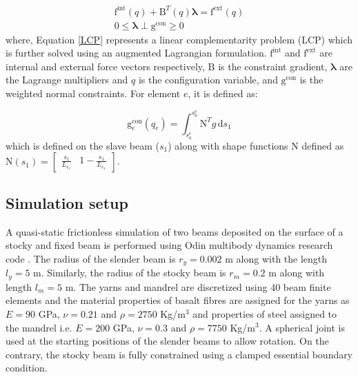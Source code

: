 \begin{subequations}
\begin{gather}
\boldsymbol{\mathrm{f}}^{\textrm{int}}(q) + \boldsymbol{\mathrm{B}}^{T}(q) \boldsymbol{\lambda} = \boldsymbol{\mathrm{f}}^{\textrm{ext}}(q)\\ %
\boldsymbol{\mathrm{0}} \leq \boldsymbol{\lambda} \perp \boldsymbol{\mathrm{g}}^{\textrm{con}} \geq \boldsymbol{\mathrm{0}} \label{LCP}
\end{gather}
\label{equilibrium}
\end{subequations}
where, Equation \ref{LCP} represents a linear complementarity problem (LCP) which is further solved using an augmented Lagrangian formulation. $\boldsymbol{\mathrm{f}}^{\textrm{int}}$ and $\boldsymbol{\mathrm{f}}^{\textrm{ext}}$ are internal and external force vectors respectively, $\boldsymbol{\mathrm{B}}$ is the constraint gradient, $\boldsymbol{\lambda}$ are the Lagrange multipliers and $q$ is the configuration variable, and $\boldsymbol{\mathrm{g}}^{\textrm{con}}$ is the weighted normal constraints. For element $e$, it is defined as: 

\begin{equation}
    \boldsymbol{\mathrm{g}}_e^{\textrm{con}}(q_e) = \int_{s^e_{a}}^{s^e_{b}} \boldsymbol{\mathrm{N}}^{T} g \, \mathrm{d}s_1
\end{equation}
which is defined on the slave beam ($s_1$) along with shape functions $\boldsymbol{\mathrm{N}}$ defined as $\boldsymbol{\mathrm{N}} (s_1) = \begin{bmatrix}
\frac{s_1}{L_{e_1}} & 1 - \frac{s_1}{L_{e_1}} 
\end{bmatrix}$. 

\subsection{Simulation setup}
A quasi-static frictionless simulation of two beams deposited on the surface of a stocky and fixed beam is performed using Odin multibody dynamics research code \cite{odin2022}. The radius of the slender beam is $r_y = 0.002$ m along with the length $l_y = 5$ m. Similarly, the radius of the stocky beam is $r_m = 0.2$ m along with length $l_m = 5$ m. The yarns and mandrel are discretized using 40 beam finite elements and the material properties of basalt fibres are assigned for the yarns as $E = 90$ GPa, $\nu = 0.21$ and $\rho = 2750$ Kg/m$^3$ and properties of steel assigned to the mandrel i.e. $E = 200$ GPa, $\nu = 0.3$ and $\rho = 7750$ Kg/m$^3$. A spherical joint is used at the starting positions of the slender beams to allow rotation. On the contrary, the stocky beam is fully constrained using a clamped essential boundary condition.\\


